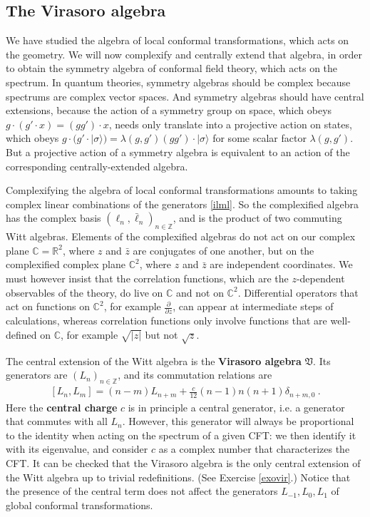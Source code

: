 \documentclass[12pt, a4paper, notitlepage, twoside]{report}
\numberwithin{equation}{section}
\theoremstyle{break}
\begin{document}
\subsection{The Virasoro algebra \label{secvir}}

We have studied the algebra of local conformal transformations, which acts on the geometry. 
We will now complexify and centrally extend that algebra, in order to obtain the symmetry algebra of conformal field theory, which acts on the spectrum. 
In quantum theories, symmetry algebras should be complex because spectrums are complex vector spaces. And symmetry algebras should have central extensions, because the action of a symmetry group on space, which obeys $g\cdot(g'\cdot x) = (gg')\cdot x$, needs only translate into a projective action on states, which obeys $g\cdot(g'\cdot|\sigma\rangle) = \lambda(g,g') (gg')\cdot |\sigma\rangle$ for some scalar factor $\lambda(g,g')$. 
But a projective action of a symmetry algebra is equivalent to an action of the corresponding centrally-extended algebra. 

Complexifying the algebra of local conformal transformations amounts to taking complex linear combinations of the generators \eqref{ilml}. So the complexified algebra has the complex basis $(\ell_n,\bar\ell_n)_{n\in\mathbb{Z}}$, and is the product of two commuting Witt algebras. Elements of the complexified algebras do not act on our complex plane $\mathbb{C}=\mathbb{R}^2$, where $z$ and $\bar z$ are conjugates of one another, but on the complexified complex plane ${\mathbb{C}}^2$, where $z$ and $\bar z$ are independent coordinates. 
We must however insist that the correlation functions, which are the $z$-dependent observables of the theory, do live on $\mathbb{C}$ and not on ${\mathbb{C}}^2$.
Differential operators that act on functions on ${\mathbb{C}}^2$, for example $\frac{\partial}{\partial z}$, can appear at intermediate steps of calculations, whereas correlation functions only involve functions that are well-defined on $\mathbb{C}$, for example $\sqrt{|z|}$ but not $\sqrt{z}$. 

The central extension of the Witt algebra is the 
\textbf{\boldmath Virasoro algebra} $\mathfrak{V}$.
Its generators are $(L_n)_{n\in {\mathbb{Z}}}$, and its commutation relations are 
\begin{align}
 \boxed{[L_n,L_m]=(n-m)L_{n+m} + \frac{c}{12} (n-1)n(n+1) \delta_{n+m,0}}\ .
\label{vir}
\end{align}
Here the \textbf{\boldmath central charge} $c$ is in principle a central generator, i.e. a generator that commutes with all $L_n$. However, this generator will always be proportional to the identity when acting on the spectrum of a given CFT: we then identify it with its eigenvalue, and consider $c$ as a complex number that characterizes the CFT. 
It can be checked that the Virasoro algebra is the only central extension of the Witt algebra up to trivial redefinitions. (See Exercise \ref{exovir}.) Notice that the presence of the central term does not affect the generators $L_{-1},L_0,L_1$ of global conformal transformations. 
\end{document}
